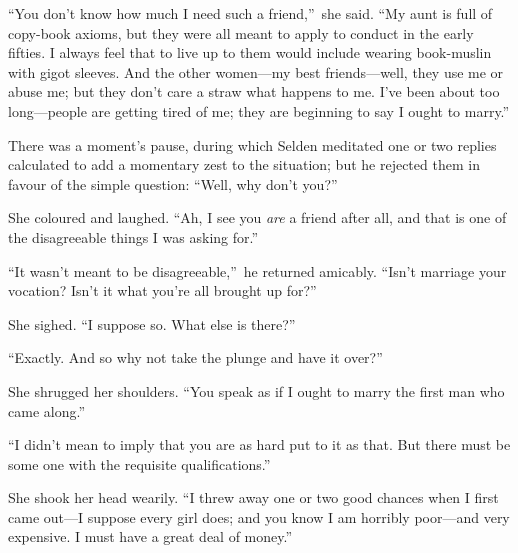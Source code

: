 \documentclass[12pt,a4paper]{book}
\begin{document}
``You don't know how much I need such a friend,''\ she said. ``My
aunt is full of copy-book axioms, but they were all meant to
apply to conduct in the early fifties. I always feel that to live
up to them would include wearing book-muslin with gigot sleeves. 
And the other women---my best friends---well, they use me or abuse
me; but they don't care a straw what happens to me. I've been
about too long---people are getting tired of me; they are
beginning to say I ought to marry.''





There was a moment's pause, during which Selden meditated one or
two replies calculated to add a momentary zest to the situation;
but he rejected them in favour of the simple question: ``Well, why
don't you?''





She coloured and laughed. ``Ah, I see you \textit{are} a friend after all,
and that is one of the disagreeable things I was asking for.''





``It wasn't meant to be disagreeable,''\ he returned amicably. 
``Isn't marriage your vocation? Isn't it what you're all brought
up for?''





She sighed. ``I suppose so. What else is there?''





``Exactly. And so why not take the plunge and have it over?''





She shrugged her shoulders. ``You speak as if I ought to marry the
first man who came along.''





``I didn't mean to imply that you are as hard put to it as
that. But there must be some one with the requisite
qualifications.''





She shook her head wearily. ``I threw away one or two good chances
when I first came out---I suppose every girl does; and you know I
am horribly poor---and very expensive. I must have a great deal of
money.''
\end{document}

